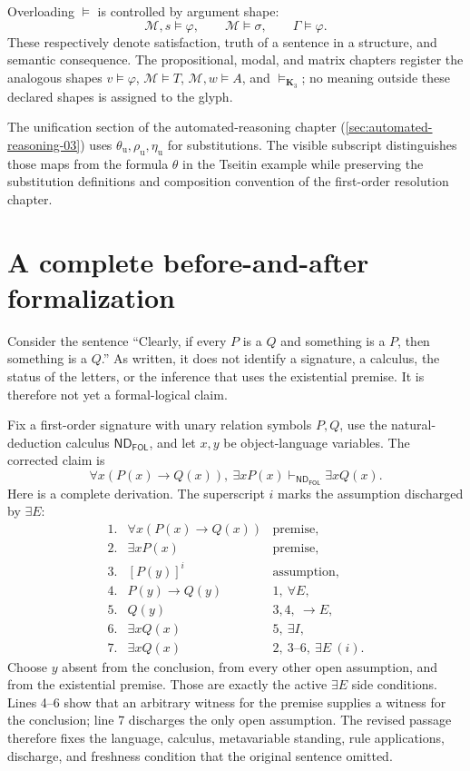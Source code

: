 \documentclass[11pt,oneside,openany]{book}
\theoremstyle{definition}
\theoremstyle{plain}
\theoremstyle{remark}
\newcommand{\entails}{\models}
\newcommand{\derives}{\vdash}
\newcommand{\ND}{\mathsf{ND}}
\newcommand{\FOL}{\mathsf{FOL}}
\begin{document}
Overloading \(\entails\) is controlled by argument shape:
\[
  \mathcal M,s\entails\varphi,
  \qquad
  \mathcal M\entails\sigma,
  \qquad
  \Gamma\entails\varphi.
\]
These respectively denote satisfaction, truth of a sentence in a structure,
and semantic consequence.  The propositional, modal, and matrix chapters
register the analogous shapes \(v\entails\varphi\),
\(\mathcal M\entails T\), \(\mathcal M,w\entails A\), and
\(\entails_{\mathbf K_3}\); no meaning outside these declared shapes is
assigned to the glyph.

The unification section of the automated-reasoning chapter
(\cref{sec:automated-reasoning-03}) uses
\(\theta_{\mathrm u},\rho_{\mathrm u},\eta_{\mathrm u}\) for substitutions.
The visible subscript distinguishes those maps from the formula \(\theta\) in
the Tseitin example while preserving the substitution definitions and
composition convention of the first-order resolution chapter.

\section{A complete before-and-after formalization}
\label{sec:latex-style-before-after}

Consider the sentence ``Clearly, if every \(P\) is a \(Q\) and something is a
\(P\), then something is a \(Q\).''  As written, it does not identify a
signature, a calculus, the status of the letters, or the inference that uses the
existential premise.  It is therefore not yet a formal-logical claim.

Fix a first-order signature with unary relation symbols \(P,Q\), use the
natural-deduction calculus \(\ND_{\FOL}\), and let \(x,y\) be object-language
variables.  The corrected claim is
\[
  \forall x(P(x)\to Q(x)),\ \exists xP(x)
  \derives_{\ND_{\FOL}} \exists xQ(x).
\]
Here is a complete derivation.  The superscript \(i\) marks the assumption
discharged by \(\exists E\):
\[
\begin{array}{rll}
1.&\forall x(P(x)\to Q(x))&\text{premise},\\
2.&\exists xP(x)&\text{premise},\\
3.&[P(y)]^i&\text{assumption},\\
4.&P(y)\to Q(y)&1,\ \forall E,\\
5.&Q(y)&3,4,\ \to E,\\
6.&\exists xQ(x)&5,\ \exists I,\\
7.&\exists xQ(x)&2,\ 3\text{--}6,\ \exists E\ (i).
\end{array}
\]
Choose \(y\) absent from the conclusion, from every other open assumption, and
from the existential premise.  Those are exactly the active
\(\exists E\) side conditions.  Lines 4--6 show that an arbitrary witness for
the premise supplies a witness for the conclusion; line 7 discharges the only
open assumption.  The revised passage therefore fixes the language,
calculus, metavariable standing, rule applications, discharge, and freshness
condition that the original sentence omitted.
\end{document}
